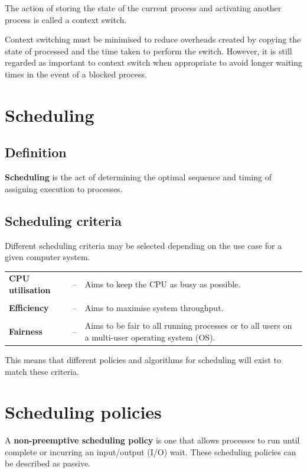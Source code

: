 \documentclass[a4paper]{systems-software}
\begin{document}
The action of storing the state of the current process and activating another process is called a context switch.

Context switching must be minimised to reduce overheads created by copying the state of processed and the time taken to perform the switch. However, it is still regarded as important to context switch when appropriate to avoid longer waiting times in the event of a blocked process.


\section*{Scheduling}

\subsection*{Definition}

\textbf{Scheduling} is the act of determining the optimal sequence and timing of assigning execution to processes.


\subsection*{Scheduling criteria}

Different scheduling criteria may be selected depending on the use case for a given computer system.

\begin{longtabu} to \textwidth { X[1.5,l] X[0.2,l] X[7,l]}
	\textbf{\textbullet CPU utilisation}
	& -- &
	Aims to keep the CPU as busy as possible.
	\\
	\\
	\textbf{\textbullet Efficiency}
	& -- &
	Aims to maximise system throughput.
	\\
	\\
	\textbf{\textbullet Fairness}
	& -- &
	Aims to be fair to all running processes or to all users on a multi-user operating system (OS).
\end{longtabu}

This means that different policies and algorithms for scheduling will exist to match these criteria.


\section*{Scheduling policies}

A \textbf{non-preemptive scheduling policy} is one that allows processes to run until complete or incurring an input/output (I/O) wait. These scheduling policies can be described as passive.
\end{document}

